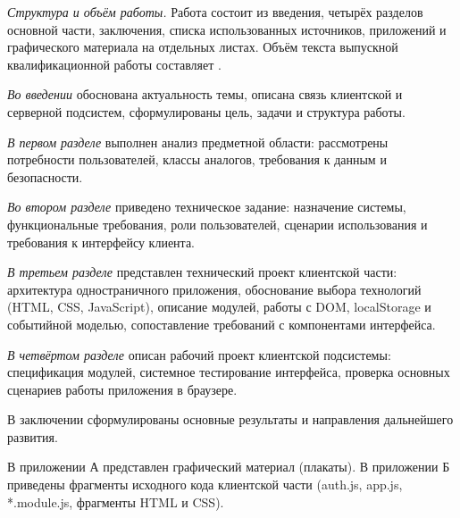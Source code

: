 \emph{Структура и объём работы.} Работа состоит из введения, четырёх разделов основной части, заключения, списка использованных источников, приложений и графического материала на отдельных листах. Объём текста выпускной квалификационной работы составляет .

\emph{Во введении} обоснована актуальность темы, описана связь клиентской и серверной подсистем, сформулированы цель, задачи и структура работы.

\emph{В первом разделе} выполнен анализ предметной области: рассмотрены потребности пользователей, классы аналогов, требования к данным и безопасности.

\emph{Во втором разделе} приведено техническое задание: назначение системы, функциональные требования, роли пользователей, сценарии использования и требования к интерфейсу клиента.

\emph{В третьем разделе} представлен технический проект клиентской части: архитектура одностраничного приложения, обоснование выбора технологий (HTML, CSS, JavaScript), описание модулей, работы с DOM, localStorage и событийной моделью, сопоставление требований с компонентами интерфейса.

\emph{В четвёртом разделе} описан рабочий проект клиентской подсистемы: спецификация модулей, системное тестирование интерфейса, проверка основных сценариев работы приложения в браузере.

В заключении сформулированы основные результаты и направления дальнейшего развития.

В приложении А представлен графический материал (плакаты). В приложении Б приведены фрагменты исходного кода клиентской части (auth.js, app.js, *.module.js, фрагменты HTML и CSS).
